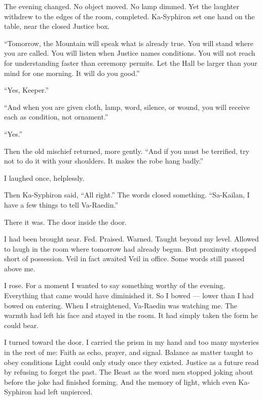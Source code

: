 The evening changed. No object moved. No lamp dimmed. Yet the laughter withdrew to the edges of the room, completed.
Ka-Syphiron set one hand on the table, near the closed Justice box.\par

``Tomorrow, the Mountain will speak what is already true. You will stand where you are called. You will listen when Justice names conditions. You will not reach for understanding faster than ceremony permits. Let the Hall be larger than your mind for one morning. It will do you good.''\par

``Yes, Keeper.''\par

``And when you are given cloth, lamp, word, silence, or wound, you will receive each as condition, not ornament.''\par

``Yes.''\par

Then the old mischief returned, more gently. ``And if you must be terrified, try not to do it with your shoulders. It makes the robe hang badly.''\par

I laughed once, helplessly.\par

Then Ka-Syphiron said, ``All right.'' The words closed something. ``Sa-Kailan, I have a few things to tell Va-Raedin.''\par

There it was. The door inside the door.\par

I had been brought near. Fed. Praised. Warned. Taught beyond my level. Allowed to laugh in the room where tomorrow had already begun. But proximity stopped short of possession. Veil in fact awaited Veil in office. Some words still passed above me.\par

I rose. For a moment I wanted to say something worthy of the evening. Everything that came would have diminished it. So I bowed --- lower than I had bowed on entering.
When I straightened, Va-Raedin was watching me. The warmth had left his face and stayed in the room. It had simply taken the form he could bear.\par

I turned toward the door. I carried the prism in my hand and too many mysteries in the rest of me: Faith as echo, prayer, and signal. Balance as matter taught to obey conditions Light could only study once they existed. Justice as a future read by refusing to forget the past. The Beast as the word men stopped joking about before the joke had finished forming. And the memory of light, which even Ka-Syphiron had left unpierced.\par

